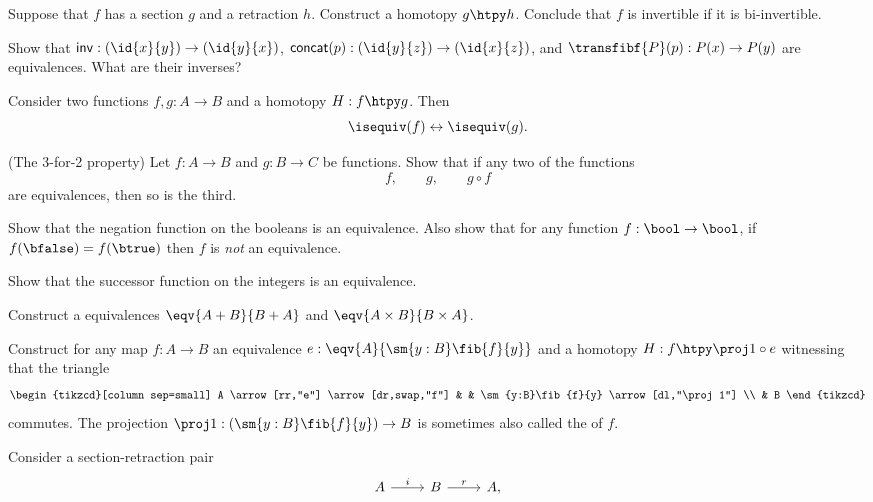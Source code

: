 \begin{exercises}
\item Suppose that $f$ has a section $g$ and a retraction $h$. Construct a homotopy $g\htpy h$. Conclude that $f$ is invertible if it is bi-invertible.
\item Show that $\mathsf{inv}:(\id{x}{y})\to(\id{y}{x})$, $\mathsf{concat}(p):(\id{y}{z})\to(\id{x}{z})$, and $\transfibf{P}(p):P(x)\to P(y)$ are equivalences. What are their inverses?
\item \label{ex:htpy_equiv} Consider two functions $f,g:A\to B$ and a homotopy $H:f\htpy g$. Then
\begin{equation*}
\isequiv(f)\leftrightarrow\isequiv(g).
\end{equation*}
\item \label{ex:3_for_2} (The 3-for-2 property) Let $f:A\to B$ and $g:B\to C$ be functions. Show that if any two of the functions
\begin{equation*}
f,\qquad g,\qquad g\circ f
\end{equation*}
are equivalences, then so is the third.
\item \label{ex:neg_equiv} Show that the negation function on the booleans is an equivalence. Also show that for any function $f:\bool\to\bool$, if $f(\bfalse)=f(\btrue)$ then $f$ is \emph{not} an equivalence.
\item \label{ex:succ_equiv} Show that the successor function on the integers is an equivalence.
\item Construct a equivalences $\eqv{A+B}{B+A}$ and $\eqv{A\times B}{B\times A}$.
\item Construct for any map $f:A\to B$ an equivalence $e:\eqv{A}{\sm{y:B}\fib{f}{y}}$ and a homotopy $H:f\htpy \proj 1\circ e$ witnessing that the triangle
\begin{equation*}
\begin{tikzcd}[column sep=small]
A \arrow[rr,"e"] \arrow[dr,swap,"f"] & & \sm{y:B}\fib{f}{y} \arrow[dl,"\proj 1"] \\
& B
\end{tikzcd}
\end{equation*}
commutes. The projection $\proj 1 : (\sm{y:B}\fib{f}{y})\to B$ is sometimes also called the  of $f$.
\item \label{ex:retr_id} Consider a section-retraction pair
\begin{equation*}
\begin{tikzcd}
A \arrow[r,"i"] & B \arrow[r,"r"] & A,
\end{tikzcd}

\end{equation*}
\end{exercises}
